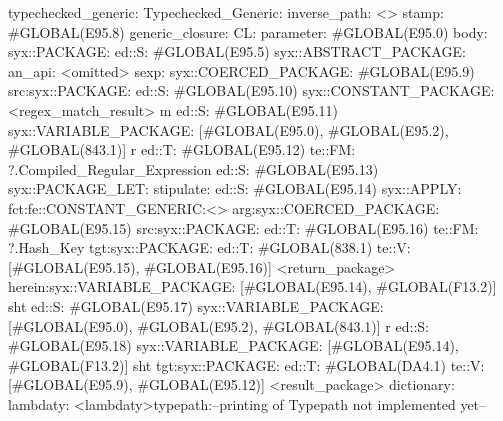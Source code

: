 typechecked_generic:
Typechecked_Generic:
inverse_path: <>
stamp: #GLOBAL(E95.8)
generic_closure:
CL:
parameter: #GLOBAL(E95.0)
body: syx::PACKAGE:
        ed::S: #GLOBAL(E95.5)
            syx::ABSTRACT_PACKAGE:
                an_api: <omitted>
                sexp:
                    syx::COERCED_PACKAGE:
                        #GLOBAL(E95.9)
                         src:syx::PACKAGE:
                                ed::S: #GLOBAL(E95.10) syx::CONSTANT_PACKAGE: <regex_match_result> m
                                ed::S: #GLOBAL(E95.11) syx::VARIABLE_PACKAGE: [#GLOBAL(E95.0), #GLOBAL(E95.2), #GLOBAL(843.1)] r
                                ed::T: #GLOBAL(E95.12) te::FM: ?.Compiled_Regular_Expression
                                    ed::S: #GLOBAL(E95.13)
                                        syx::PACKAGE_LET:
                                            stipulate:  ed::S: #GLOBAL(E95.14)
                                                            syx::APPLY:
                                                                fct:fe::CONSTANT_GENERIC:<>
                                                                arg:syx::COERCED_PACKAGE:
                                                                        #GLOBAL(E95.15)
                                                                         src:syx::PACKAGE:
                                                                         ed::T: #GLOBAL(E95.16) te::FM: ?.Hash_Key
                                                                        tgt:syx::PACKAGE:
                                                                         ed::T: #GLOBAL(838.1) te::V: [#GLOBAL(E95.15), #GLOBAL(E95.16)]
                                                         <return_package>
                                            herein:syx::VARIABLE_PACKAGE:
                                             [#GLOBAL(E95.14), #GLOBAL(F13.2)]
                                     sht
                            ed::S: #GLOBAL(E95.17)
                             syx::VARIABLE_PACKAGE:
                             [#GLOBAL(E95.0), #GLOBAL(E95.2), #GLOBAL(843.1)]
                             r
                            ed::S: #GLOBAL(E95.18)
                             syx::VARIABLE_PACKAGE:
                             [#GLOBAL(E95.14), #GLOBAL(F13.2)]
                             sht
                        tgt:syx::PACKAGE:
                         ed::T: #GLOBAL(DA4.1) te::V: [#GLOBAL(E95.9), #GLOBAL(E95.12)]
         <result_package>
dictionary:
lambdaty:
  <lambdaty>typepath:--printing of Typepath not implemented yet--
